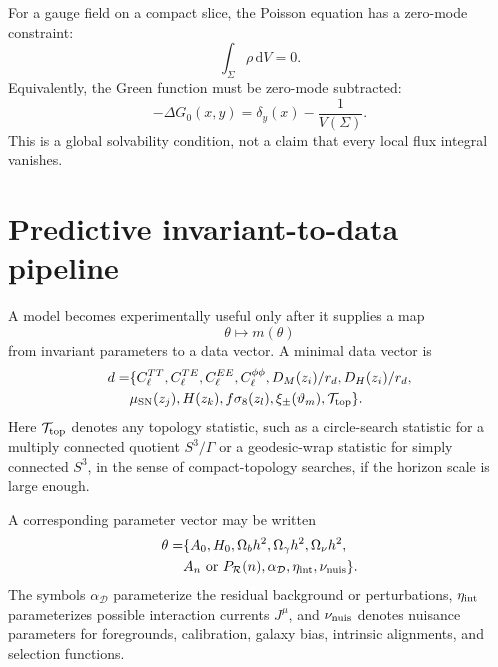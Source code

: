 \documentclass[
  aps,
  prd,
  reprint,
  superscriptaddress,
  nofootinbib,
  floatfix,
  longbibliography
]{revtex4-2}
\newcommand{\D}{\mathcal D}
\newcommand{\dd}{\mathrm d}
\begin{document}
For a gauge field on a compact slice, the Poisson equation has a
zero-mode constraint:
\begin{equation}
  \int_\Sigma \rho\,\dd V=0 .
  \label{eq:gauss_zero}
\end{equation}
Equivalently, the Green function must be zero-mode subtracted:
\begin{equation}
  -\Delta G_0(x,y)=\delta_y(x)-\frac1{V(\Sigma)} .
  \label{eq:zero_subtracted_green}
\end{equation}
This is a global solvability condition, not a claim that every local
flux integral vanishes.

\section{Predictive invariant-to-data pipeline}
\label{sec:pipeline}

A model becomes experimentally useful only after it supplies a map
\begin{equation}
  \theta\longmapsto m(\theta)
  \label{eq:model_map}
\end{equation}
from invariant parameters to a data vector.  A minimal data vector is
\begin{equation}
\begin{split}
  d=&\{C_\ell^{TT},C_\ell^{TE},C_\ell^{EE},C_\ell^{\phi\phi},
  D_M(z_i)/r_d,D_H(z_i)/r_d,\\
  &\mu_{\rm SN}(z_j),H(z_k),f\sigma_8(z_l),
  \xi_\pm(\vartheta_m),{\cal T}_{\rm top}\}.
\end{split}
\label{eq:data_vector}
\end{equation}
Here \({\cal T}_{\rm top}\) denotes any topology statistic, such as a
circle-search statistic for a multiply connected quotient
\(S^3/\Gamma\) or a geodesic-wrap statistic for simply connected
\(S^3\), in the sense of compact-topology searches, if the horizon
scale is large enough.

A corresponding parameter vector may be written
\begin{equation}
\begin{split}
  \theta=&\{A_0,H_0,\Omega_bh^2,\Omega_\gamma h^2,
  \Omega_\nu h^2,\\
  &A_n\ \text{or}\ P_{\cal R}(n),
  \alpha_{\D},\eta_{\rm int},\nu_{\rm nuis}\}.
\end{split}
\label{eq:parameter_vector}
\end{equation}
The symbols \(\alpha_\D\) parameterize the residual background or
perturbations, \(\eta_{\rm int}\) parameterizes possible interaction
currents \(J^\mu\), and \(\nu_{\rm nuis}\) denotes nuisance parameters
for foregrounds, calibration, galaxy bias, intrinsic alignments, and
selection functions.
\end{document}
